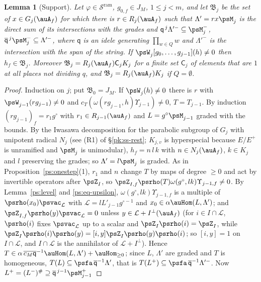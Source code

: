 \documentclass[10pt]{amsart}
\newtheorem{lemma}[theorem]{Lemma}
\theoremstyle{definition}
\theoremstyle{remark}
\providecommand{\auSram}{\mathcal S^{\mathrm{ram}}}
\providecommand{\aubar}[1]{\overline{#1}}
\begin{document}
\begin{lemma}[Support]\label{ps:support}
Let $\varphi\in\auSram$, $g_{0,f}\in J_M$, $1\le j<m$, and let $\mathfrak B_j$ be the set of
$x\in G_j(\auA_f)$ for which there is $r\in R_j(\auA_f)$ such that $\Lambda'=rx\psM_j$ is the
direct sum of its intersections with the grades and $\mathsf q^{\,j}\Lambda'^-\subseteq\psM_j^-$,
$\aubar{\mathsf q}^{\,j}\psM_j^-\subseteq\Lambda'^-$, where $\mathsf q$ is an idele generating
$\prod_{w\in Q}w$ and $\Lambda'^-$ is the intersection with the span of the string. If
$\psW_j[g_0,\dots,g_{j-1}](h)\ne0$ then $h_f\in\mathfrak B_j$. Moreover $\mathfrak B_j=R_j(\auA_f)
\mathsf C_jK_j$ for a finite set $\mathsf C_j$ of elements that are $1$ at all places not dividing
$q$, and $\mathfrak B_j=R_j(\auA_f)K_j$ if $Q=\emptyset$.
\end{lemma}
\begin{proof}
Induction on $j$; put $\mathfrak B_0=J_M$. If $\psW_j(h)\ne0$ there is $r$ with
$\psW_{j-1}(rg_{j-1})\ne0$ and $c_T(\omega(rg_{j-1},h)\Upsilon_{j-1})\ne0$, $T=T_{j-1}$. By induction
$(rg_{j-1})_f=r_1g^\circ$ with $r_1\in R_{j-1}(\auA_f)$ and $L=g^\circ\psM_{j-1}$ graded with the
bounds. By the Iwasawa decomposition for the parabolic subgroup of $G_j$ with unipotent radical
$N_j$ (see (R1) of \S\ref{pk:ss-rest}; $K_{j,v}$ is hyperspecial because $E/E^+$ is unramified and
$\psM_j$ is unimodular), $h_f=n\,l\,k$ with $n\in N_j(\auA_f)$, $k\in K_j$ and $l$ preserving the grades; so
$\Lambda'=l\psM_j$ is graded. As in Proposition~\ref{ps:onestep}(1), $r_1$ and $n$ change $T$ by
maps of degree $\ge0$ and act by invertible operators after $\psZ_I$, so
$\psZ_{I,f}\psrho(T)\omega(g^\circ,lk)\Upsilon_{j-1,f}\ne0$. By Lemma~\ref{ps:level} and
\eqref{ps:eq-upsilon}, $\omega(g^\circ,lk)\Upsilon_{j-1,f}$ is a multiple of $\psrho(x_0)
\psvac_{\mathcal L}$ with $\mathcal L=lL'_{j-1}g^{\circ-1}$ and $x_0\in\alpha\auHom(L,\Lambda')$; and
$\psZ_{I,f}\psrho(y)\psvac_{\mathcal L}=0$ unless $y\in\mathcal L+I^\perp(\auA_f)$ (for $i\in
I\cap\mathcal L$, $\psrho(i)$ fixes $\psvac_{\mathcal L}$ up to a scalar and $\psZ_I\psrho(i)=\psZ_I$,
while $\psZ_I\psrho(i)\psrho(y)=[i,y]\psZ_I\psrho(y)\psrho(i)$; so $[i,y]=1$ on $I\cap\mathcal L$,
and $I\cap\mathcal L$ is the annihilator of $\mathcal L+I^\perp$). Hence $T\in\alpha\,\aubar{c_M
\mathsf q}^{-1}\auHom(L,\Lambda')+\auHom_{\ge0}$; since $L$, $\Lambda'$ are graded and $T$ is
homogeneous, $T(L)\subseteq\psfa\,\aubar{\mathsf q}^{-1}\Lambda'$, that is $T(L^+)\subseteq\psfa\,
\aubar{\mathsf q}^{-1}\Lambda'^-$. Now $L^+=(L^-)^\#\supseteq\aubar{\mathsf q}^{\,j-1}\psM_{j-1}^+$

\end{proof}
\end{document}
